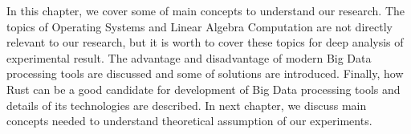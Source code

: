 In this chapter, we cover some of main concepts to understand our research. 
The topics of Operating Systems and Linear Algebra Computation are not directly relevant to our research, 
but it is worth to cover these topics for deep analysis of experimental result. 
The advantage and disadvantage of modern Big Data processing tools are discussed and 
some of solutions are introduced. Finally, how Rust can be a good candidate for development of Big Data processing tools and 
details of its technologies are described. In next chapter, we discuss main concepts needed to understand theoretical assumption of our experiments.